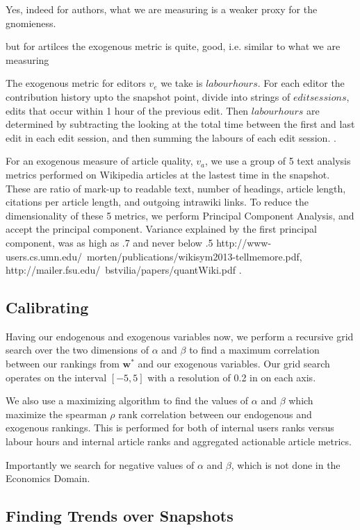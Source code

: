 \documentclass{acm_proc_article-sp}
\begin{document}
Yes, indeed for authors, what we are measuring is a weaker proxy for the gnomieness.

but for artilces the exogenous metric is quite, good, i.e. similar to what we are measuring

The exogenous metric for editors $v_e$ we take is $labour hours$. For each editor the contribution history upto the snapshot point,  divide into strings of $edit sessions$, edits that occur within 1 hour of the previous edit. Then $labour hours$ are determined by subtracting the looking at the total time between the first and last edit in each edit session, and then summing the labours of each edit session. \cite{Geiger, Halfaker}. 

For an exogenous measure of article quality, $ v_a$,  we use a group of 5 text analysis metrics performed on Wikipedia articles at the lastest time in the snapshot. These are ratio of mark-up to readable text, number of headings, article length, citations per article length, and outgoing intrawiki links. To reduce the dimensionality of these 5 metrics, we perform Principal Component Analysis, and accept the principal component. Variance explained by the first principal component, was as high as .7 and never below .5 http://www-users.cs.umn.edu/~morten/publications/wikisym2013-tellmemore.pdf, http://mailer.fsu.edu/~bstvilia/papers/quantWiki.pdf \cite{ Morten}.


\subsection{Calibrating}

Having our endogenous and exogenous variables now, we perform a recursive grid search over the two dimensions of $\alpha$ and $\beta$ to find a maximum correlation between our rankings from $\mathbf{w^*}$ and our exogenous variables. Our grid search operates on the interval $[-5,5]$ with a resolution of 0.2 in on each axis.


We also use a maximizing algorithm to find the values of $\alpha$ and $\beta$ which maximize the spearman $\rho$ rank correlation between our endogenous and exogenous rankings. This is performed for both of internal users ranks versus labour hours and internal article ranks and aggregated actionable article metrics.

Importantly we search for negative values of $\alpha$ and $\beta$, which is not done in the Economics Domain.

\subsection{Finding Trends over Snapshots}
\end{document}
